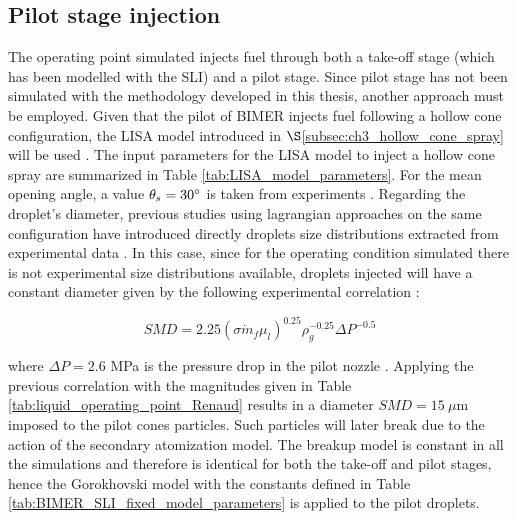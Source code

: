 %




\subsection{Pilot stage injection}

The operating point simulated injects fuel through both a take-off stage (which has been modelled with the SLI) and a pilot stage. Since pilot stage has not been simulated with the methodology developed in this thesis, another approach must be employed. Given that the pilot of BIMER injects fuel following a hollow cone configuration, the LISA model introduced in $\S$\ref{subsec:ch3_hollow_cone_spray} will be used .   The input parameters for the LISA model to inject a hollow cone spray are summarized in Table \ref{tab:LISA_model_parameters}. For the mean opening angle, a value $\theta_s = 30 \degree$ is taken from experiments . Regarding the droplet's diameter, previous studies using lagrangian approaches on the same configuration have introduced directly droplets size distributions extracted from experimental data . In this case, since for the operating condition simulated there is not experimental size distributions available, droplets injected will have a constant diameter given by the following experimental correlation :

\begin{equation}
SMD = 2.25 \left( \sigma \dot{m}_f \mu_l \right)^{0.25} \rho_g^{-0.25}  \Delta P^{-0.5}
\end{equation}

where $\Delta P = 2.6$ MPa is the pressure drop in the pilot nozzle . Applying the previous correlation with the magnitudes given in Table \ref{tab:liquid_operating_point_Renaud} results in a diameter $SMD = 15~\mu$m imposed to the pilot cones particles. Such particles will later break due to the action of the secondary atomization model. The breakup model is constant in all the simulations and therefore is identical for both the take-off and pilot stages, hence the Gorokhovski model with the constants defined in Table \ref{tab:BIMER_SLI_fixed_model_parameters} is applied to the pilot droplets. 


